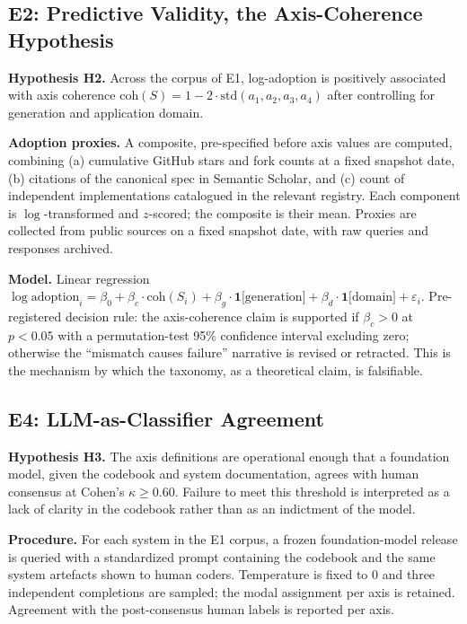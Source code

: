 \documentclass[10pt,twocolumn]{article}
\begin{document}
\subsection{E2: Predictive Validity, the Axis-Coherence Hypothesis}

\textbf{Hypothesis H2.}  Across the corpus of E1, log-adoption is positively associated with axis coherence $\mathrm{coh}(S) = 1 - 2\cdot\mathrm{std}(a_1, a_2, a_3, a_4)$ after controlling for generation and application domain.

\textbf{Adoption proxies.}  A composite, pre-specified before axis values are computed, combining (a) cumulative GitHub stars and fork counts at a fixed snapshot date, (b) citations of the canonical spec in Semantic Scholar, and (c) count of independent implementations catalogued in the relevant registry.  Each component is $\log$-transformed and $z$-scored; the composite is their mean.  Proxies are collected from public sources on a fixed snapshot date, with raw queries and responses archived.

\textbf{Model.}  Linear regression $\log\text{adoption}_i = \beta_0 + \beta_c \cdot \mathrm{coh}(S_i) + \beta_g \cdot \mathbf{1}\text{[generation]} + \beta_d \cdot \mathbf{1}\text{[domain]} + \varepsilon_i$.  Pre-registered decision rule: the axis-coherence claim is supported if $\beta_c > 0$ at $p < 0.05$ with a permutation-test 95\% confidence interval excluding zero; otherwise the ``mismatch causes failure'' narrative is revised or retracted.  This is the mechanism by which the taxonomy, as a theoretical claim, is falsifiable.

\subsection{E4: LLM-as-Classifier Agreement}

\textbf{Hypothesis H3.}  The axis definitions are operational enough that a foundation model, given the codebook and system documentation, agrees with human consensus at Cohen's $\kappa \geq 0.60$.  Failure to meet this threshold is interpreted as a lack of clarity in the codebook rather than as an indictment of the model.

\textbf{Procedure.}  For each system in the E1 corpus, a frozen foundation-model release is queried with a standardized prompt containing the codebook and the same system artefacts shown to human coders.  Temperature is fixed to $0$ and three independent completions are sampled; the modal assignment per axis is retained.  Agreement with the post-consensus human labels is reported per axis.
\end{document}
